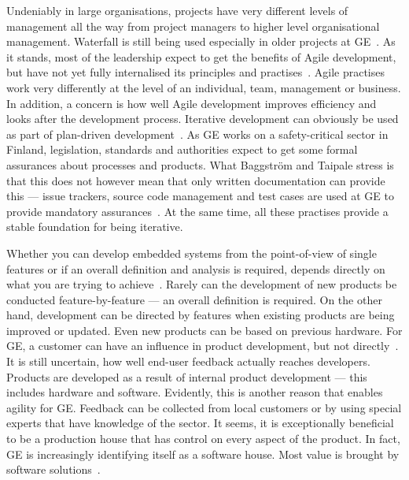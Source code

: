 \documentclass[english]{tktltiki2}
\begin{document}
Undeniably in large organisations, projects have very different levels of management all the way from project managers to higher level organisational management. Waterfall is still being used especially in older projects at GE~\cite{BT15}. As it stands, most of the leadership expect to get the benefits of Agile development, but have not yet fully internalised its principles and practises~\cite{BT15}. Agile practises work very differently at the level of an individual, team, management or business. In addition, a concern is how well Agile development improves efficiency and looks after the development process. Iterative development can obviously be used as part of plan-driven development~\cite{BT15, Hol15b}. As GE works on a safety-critical sector in Finland, legislation, standards and authorities expect to get some formal assurances about processes and products. What Baggström and Taipale stress is that this does not however mean that only written documentation can provide this — issue trackers, source code management and test cases are used at GE to provide mandatory assurances~\cite{BT15}. At the same time, all these practises provide a stable foundation for being iterative.

Whether you can develop embedded systems from the point-of-view of single features or if an overall definition and analysis is required, depends directly on what you are trying to achieve~\cite{BT15}. Rarely can the development of new products be conducted feature-by-feature — an overall definition is required. On the other hand, development can be directed by features when existing products are being improved or updated. Even new products can be based on previous hardware. For GE, a customer can have an influence in product development, but not directly~\cite{BT15}. It is still uncertain, how well end-user feedback actually reaches developers. Products are developed as a result of internal product development — this includes hardware and software. Evidently, this is another reason that enables agility for GE. Feedback can be collected from local customers or by using special experts that have knowledge of the sector. It seems, it is exceptionally beneficial to be a production house that has control on every aspect of the product. In fact, GE is increasingly identifying itself as a software house. Most value is brought by software solutions~\cite{BT15}.
\end{document}
